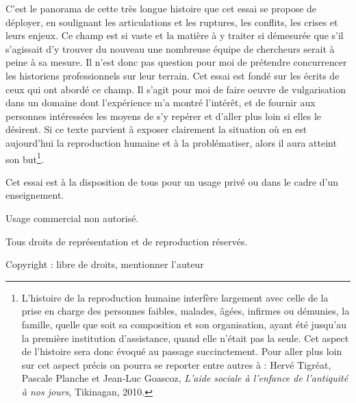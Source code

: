 C'est le panorama de cette très longue histoire que cet essai se propose de déployer, en soulignant les articulations et les ruptures, les
conflits, les crises et leurs enjeux. Ce champ est si vaste et la matière à y traiter  si démesurée que s'il s'agissait d'y trouver du nouveau une nombreuse équipe de chercheurs serait à peine à sa mesure. Il n'est donc pas question pour moi de prétendre concurrencer les historiens professionnels sur leur terrain. 
Cet essai est fondé sur les écrits de ceux qui ont abordé ce champ. Il s'agit pour moi de faire oeuvre de vulgarisation dans un domaine dont l'expérience m'a montré l'intérêt, et de fournir aux personnes intéressées les moyens de s'y repérer et d'aller plus loin si elles le désirent. Si ce texte parvient à exposer clairement la situation où en est aujourd'hui la reproduction humaine et à la problématiser, alors il aura atteint son but\footnote{L'histoire de la reproduction humaine interfère largement avec celle
de la prise en charge des personnes faibles, malades, âgées, infirmes ou
démunies, la famille, quelle que soit sa composition et son organisation, ayant été jusqu'au  la première institution
d'assistance, quand elle n'était pas la seule. Cet aspect de l'histoire sera donc évoqué
au passage succinctement. Pour aller plus loin sur cet aspect précis on
pourra se reporter entre autres à : Hervé Tigréat, Pascale Planche et Jean-Luc Goascoz, \emph{L'aide sociale à l'enfance de l'antiquité à nos jours}, Tikinagan, 2010.}.

Cet essai est à la disposition de tous pour un usage privé ou dans le cadre d'un enseignement. 

Usage commercial non autorisé. 

Tous droits de représentation et de reproduction réservés.

Copyright : libre de droits, mentionner l'auteur